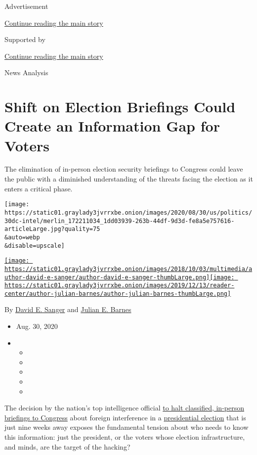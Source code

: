Advertisement

\protect\hyperlink{after-top}{Continue reading the main story}

Supported by

\protect\hyperlink{after-sponsor}{Continue reading the main story}

News Analysis

\hypertarget{shift-on-election-briefings-could-create-an-information-gap-for-voters}{%
\section{Shift on Election Briefings Could Create an Information Gap for
Voters}\label{shift-on-election-briefings-could-create-an-information-gap-for-voters}}

The elimination of in-person election security briefings to Congress
could leave the public with a diminished understanding of the threats
facing the election as it enters a critical phase.

\texttt{[image: https://static01.graylady3jvrrxbe.onion/images/2020/08/30/us/politics/30dc-intel/merlin\_172211034\_1dd03939-263b-44df-9d3d-fe8a5e757616-articleLarge.jpg?quality=75\\\&auto=webp\\\&disable=upscale]}

\href{https://www.nytimes3xbfgragh.onion/by/david-e-sanger}{\texttt{[image: https://static01.graylady3jvrrxbe.onion/images/2018/10/03/multimedia/author-david-e-sanger/author-david-e-sanger-thumbLarge.png]}}\href{https://www.nytimes3xbfgragh.onion/by/julian-e-barnes}{\texttt{[image: https://static01.graylady3jvrrxbe.onion/images/2019/12/13/reader-center/author-julian-barnes/author-julian-barnes-thumbLarge.png]}}

By \href{https://www.nytimes3xbfgragh.onion/by/david-e-sanger}{David E.
Sanger} and
\href{https://www.nytimes3xbfgragh.onion/by/julian-e-barnes}{Julian E.
Barnes}

\begin{itemize}
\item
  Aug. 30, 2020
\item
  \begin{itemize}
  \item
  \item
  \item
  \item
  \item
  \end{itemize}
\end{itemize}

The decision by the nation's top intelligence official
\href{https://www.nytimes3xbfgragh.onion/2020/08/29/us/politics/election-security-intelligence-briefings-congress.html}{to
halt classified, in-person briefings to Congress} about foreign
interference in a
\href{https://www.nytimes3xbfgragh.onion/live/2020/09/01/us/trump-vs-biden}{presidential
election} that is just nine weeks away exposes the fundamental tension
about who needs to know this information: just the president, or the
voters whose election infrastructure, and minds, are the target of the
hacking?

